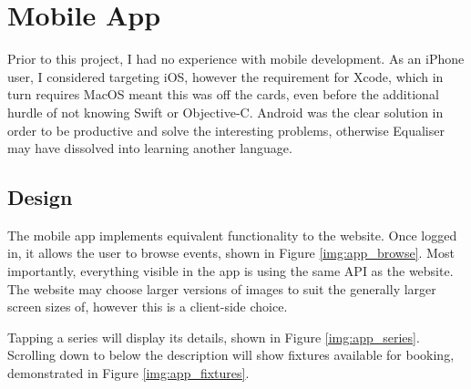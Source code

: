 \documentclass[12pt,a4paper]{bhamdissertation}
\begin{document}
\section{Mobile App}


Prior to this project, I had no experience with mobile development. As an iPhone user, I considered targeting iOS, however the requirement for Xcode, which in turn requires MacOS meant this was off the cards, even before the additional hurdle of not knowing Swift or Objective-C. Android was the clear solution in order to be productive and solve the interesting problems, otherwise Equaliser may have dissolved into learning another language.

\subsection{Design}

The mobile app implements equivalent functionality to the website. Once logged in, it allows the user to browse events, shown in Figure \ref{img:app_browse}. Most importantly, everything visible in the app is using the same API as the website. The website may choose larger versions of images to suit the generally larger screen sizes of, however this is a client-side choice.

Tapping a series will display its details, shown in Figure \ref{img:app_series}. Scrolling down to below the description will show fixtures available for booking, demonstrated in Figure \ref{img:app_fixtures}.
\end{document}
